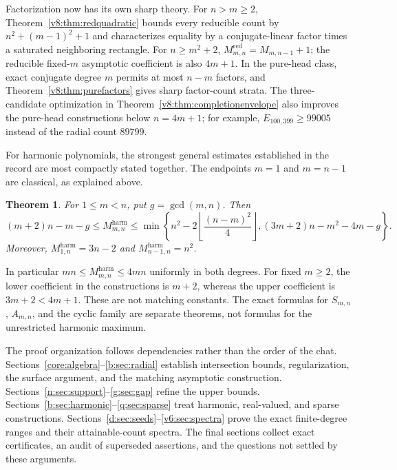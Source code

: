 \documentclass[UTF8,11pt]{ctexart}
\newtheorem{thm}{Theorem}[section]
\theoremstyle{definition}
\numberwithin{equation}{section}
\begin{document}
Factorization now has its own sharp theory. For $n>m\ge2$,
Theorem~\ref{v8:thm:redquadratic} bounds every reducible count by
$n^2+(m-1)^2+1$ and characterizes equality by a conjugate-linear
factor times a saturated neighboring rectangle. For $n\ge m^2+2$,
$M^{\mathrm{red}}_{m,n}=M_{m,n-1}+1$; the reducible fixed-$m$
asymptotic coefficient is also $4m+1$. In the pure-head class,
exact conjugate degree $m$ permits at most $n-m$ factors, and
Theorem~\ref{v8:thm:purefactors} gives sharp factor-count strata.
The three-candidate optimization in Theorem~\ref{v8:thm:completionenvelope}
also improves the pure-head constructions below $n=4m+1$; for example,
$E_{100,399}\ge99005$ instead of the radial count $89799$.

For harmonic polynomials, the strongest general estimates established in the record are most compactly stated together. The endpoints $m=1$ and $m=n-1$ are classical, as explained above.
\begin{thm}\label{core:harmonicbounds}
For $1\le m<n$, put $g=\gcd(m,n)$. Then
\begin{equation}\label{core:harmonicbounds:eq}
 (m+2)n-m-g\le M^{\mathrm{harm}}_{m,n}
 \le\min\left\{n^2-2\left\lfloor\frac{(n-m)^2}{4}\right\rfloor,
 (3m+2)n-m^2-4m-g\right\}.
\end{equation}
Moreover, $M^{\mathrm{harm}}_{1,n}=3n-2$ and $M^{\mathrm{harm}}_{n-1,n}=n^2$.
\end{thm}

In particular $mn\le M^{\mathrm{harm}}_{m,n}\le4mn$ uniformly in both degrees. For fixed $m\ge2$, the lower coefficient in the constructions is $m+2$, whereas the upper coefficient is $3m+2<4m+1$. These are not matching constants. The exact formulas for $S_{m,n}$, $A_{m,n}$, and the cyclic family are separate theorems, not formulas for the unrestricted harmonic maximum.

The proof organization follows dependencies rather than the order of the chat. Sections~\ref{core:algebra}--\ref{b:sec:radial} establish intersection bounds, regularization, the surface argument, and the matching asymptotic construction. Sections~\ref{n:sec:support}--\ref{g:sec:gap} refine the upper bounds. Sections~\ref{b:sec:harmonic}--\ref{q:sec:sparse} treat harmonic, real-valued, and sparse constructions. Sections~\ref{d:sec:seeds}--\ref{v6:sec:spectra} prove the exact finite-degree ranges and their attainable-count spectra. The final sections collect exact certificates, an audit of superseded assertions, and the questions not settled by these arguments.
\end{document}
